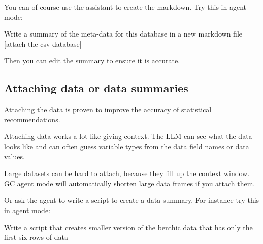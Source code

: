 \documentclass[
  letterpaper,
  DIV=11,
  numbers=noendperiod]{scrreprt}
\begin{document}
You can of course use the assistant to create the markdown. Try this in
agent mode:

\begin{tcolorbox}[enhanced jigsaw, coltitle=black, breakable, toptitle=1mm, titlerule=0mm, bottomtitle=1mm, colframe=quarto-callout-note-color-frame, left=2mm, leftrule=.75mm, title=\textcolor{quarto-callout-note-color}{\faInfo}\hspace{0.5em}{Note}, opacityback=0, colback=white, opacitybacktitle=0.6, bottomrule=.15mm, arc=.35mm, rightrule=.15mm, toprule=.15mm, colbacktitle=quarto-callout-note-color!10!white]

Write a summary of the meta-data for this database in a new markdown
file {[}attach the csv database{]}

\end{tcolorbox}

Then you can edit the summary to ensure it is accurate.

\subsection{Attaching data or data
summaries}\label{attaching-data-or-data-summaries}

\href{TODO\%20add\%20link}{Attaching the data is proven to improve the
accuracy of statistical recommendations.}

Attaching data works a lot like giving context. The LLM can see what the
data looks like and can often guess variable types from the data field
names or data values.

Large datasets can be hard to attach, because they fill up the context
window. GC agent mode will automatically shorten large data frames if
you attach them.

Or ask the agent to write a script to create a data summary. For
instance try this in agent mode:

\begin{tcolorbox}[enhanced jigsaw, coltitle=black, breakable, toptitle=1mm, titlerule=0mm, bottomtitle=1mm, colframe=quarto-callout-note-color-frame, left=2mm, leftrule=.75mm, title=\textcolor{quarto-callout-note-color}{\faInfo}\hspace{0.5em}{Note}, opacityback=0, colback=white, opacitybacktitle=0.6, bottomrule=.15mm, arc=.35mm, rightrule=.15mm, toprule=.15mm, colbacktitle=quarto-callout-note-color!10!white]

Write a script that creates smaller version of the benthic data that has
only the first six rows of data

\end{tcolorbox}
\end{document}
